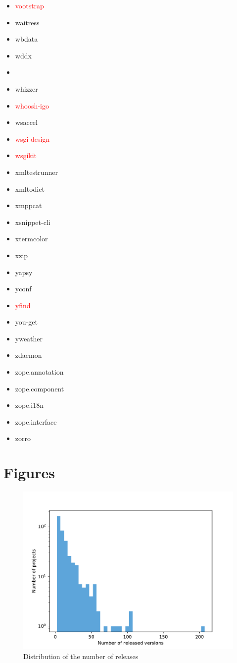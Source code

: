 \documentclass{l4proj}
\begin{document}
\begin{appendices}
{}%
\noindent\parbox[t]{0.32\textwidth}{\raggedright%
\begin{itemize}
\item\textcolor{red}{vootstrap}
\item waitress
\item wbdata
\item wddx
\item\textcolor{red}{}
\item whizzer
\item\textcolor{red}{whoosh-igo}
\item wsaccel
\item\textcolor{red}{wsgi-design}
\item\textcolor{red}{wsgikit}
\item xmltestrunner
\item xmltodict
\item xmppcat
\item xsnippet-cli
\item xtermcolor
\item xzip
\item yapsy
\item yconf
\item\textcolor{red}{yfind}
\item you-get
\item yweather
\item zdaemon
\item zope.annotation
\item zope.component
\item zope.i18n
\item zope.interface
\item zorro
\end{itemize}
}%

\section{Figures}

\begin{figure}[H]
\centering
\caption{Distribution of the number of releases}
\label{DistributionAllVersions}
\includegraphics[height=0.4\textheight]{images/evaluation/distribution_all_versions}
\end{figure}


\end{appendices}
\end{document}
